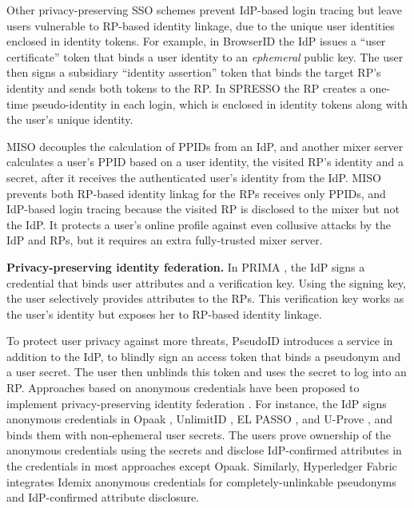 Other privacy-preserving SSO schemes prevent IdP-based login tracing but leave users vulnerable to RP-based identity linkage, due to the unique user identities enclosed in identity tokens.
For example, in BrowserID \cite{BrowserID} %
the IdP %
issues a ``user certificate'' token that binds a user identity to an \emph{ephemeral} public key. The user then signs a subsidiary ``identity assertion'' token that binds the target RP's identity and sends both tokens to the RP. In SPRESSO \cite{SPRESSO} the RP creates a one-time pseudo-identity in each login, which is enclosed in identity tokens along with the user's unique identity.

MISO \cite{miso} decouples the calculation of PPIDs from an IdP,
        and another mixer server calculates a user's PPID
    based on a user identity, the visited RP's identity and a secret,
    after it receives the authenticated user's identity from the IdP.
MISO prevents both RP-based identity linkag for the RPs receives only PPIDs,
    and IdP-based login tracing because the visited RP is disclosed to the mixer but not the IdP.
It protects a user's online profile against even collusive attacks by the IdP and RPs,
    but it requires an extra fully-trusted mixer server.


\noindent\textbf{Privacy-preserving identity federation.}
In PRIMA \cite{prima}, the IdP signs a credential
that binds user attributes and a verification key. Using the signing key, the user selectively provides attributes to the RPs. This verification key works as the user's identity but exposes her to RP-based identity linkage.

To protect user privacy against more threats, PseudoID \cite{PseudoID} introduces a service in addition to the IdP,
 to blindly sign \cite{blind-sign}
an access token that binds a pseudonym and a user secret.
The user then unblinds this token and uses the secret to log into an RP. Approaches based on anonymous credentials \cite{anon-credential-2001, idemix, anon-credential} have been proposed to implement privacy-preserving identity federation \cite{hyperledge-idemix, Opaak, uprov, UnlimitID, ELPASSO}. For instance, the IdP signs anonymous credentials in Opaak \cite{Opaak}, UnlimitID \cite{UnlimitID}, EL PASSO \cite{ELPASSO}, and U-Prove \cite{uprov,uprove-conference}, and binds them with non-ephemeral user secrets. %
The users prove ownership of the anonymous credentials using the secrets and disclose IdP-confirmed attributes in the credentials in most approaches except Opaak. Similarly, Hyperledger Fabric \cite{hyperledge-idemix} integrates Idemix anonymous credentials \cite{idemix} for completely-unlinkable pseudonyms and IdP-confirmed attribute disclosure.


